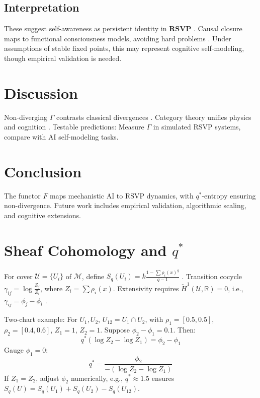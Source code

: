\documentclass{article}
\begin{document}
\subsection{Interpretation}
These suggest self-awareness as persistent identity in $\mathbf{RSVP}$ \cite{Bennett2025}. Causal closure maps to functional consciousness models, avoiding hard problems \cite{Pearl2009, Goguen1992}. Under assumptions of stable fixed points, this may represent cognitive self-modeling, though empirical validation is needed.

\section{Discussion}

Non-diverging $\Gamma$ contrasts classical divergences \cite{Soares2023}. Category theory unifies physics and cognition \cite{Spivak2014, Goguen1992}. Testable predictions: Measure $\Gamma$ in simulated RSVP systems, compare with AI self-modeling tasks.

\section{Conclusion}

The functor $F$ maps mechanistic AI to RSVP dynamics, with $q^*$-entropy ensuring non-divergence. Future work includes empirical validation, algorithmic scaling, and cognitive extensions.

\appendix

\section{Sheaf Cohomology and $q^*$}

For cover $\mathcal{U} = \{U_i\}$ of $\mathcal{M}$, define $S_q(U_i) = k \frac{1 - \sum \rho_i(x)^q}{q-1}$ \cite{Tsallis1988}. Transition cocycle $\gamma_{ij} = \log \frac{Z_j}{Z_i}$, where $Z_i = \sum \rho_i(x)$. Extensivity requires $\check{H}^1(\mathcal{U}, \mathbb{R}) = 0$, i.e., $\gamma_{ij} = \phi_j - \phi_i$ \cite{MacLane1992, Soares2024}.

Two-chart example: For $U_1, U_2$, $U_{12} = U_1 \cap U_2$, with $\rho_1 = [0.5, 0.5]$, $\rho_2 = [0.4, 0.6]$, $Z_1 = 1$, $Z_2 = 1$. Suppose $\phi_2 - \phi_1 = 0.1$. Then:
\[
q^* (\log Z_2 - \log Z_1) = \phi_2 - \phi_1
\]
Gauge $\phi_1 = 0$:
\[
q^* = \frac{\phi_2}{-(\log Z_2 - \log Z_1)}
\]
If $Z_1 = Z_2$, adjust $\phi_2$ numerically, e.g., $q^* \approx 1.5$ ensures $S_q(U) = S_q(U_1) + S_q(U_2) - S_q(U_{12})$.
\end{document}
